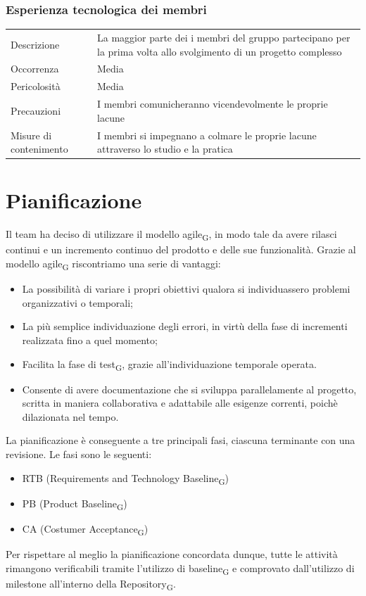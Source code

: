 \documentclass{article}
\begin{document}
\subsubsection{Esperienza tecnologica dei membri}
\begin{center}
\begin{tabular}{P{10em} P{20em}} 
     Descrizione & La maggior parte dei i membri del gruppo partecipano per la prima volta allo svolgimento di un progetto complesso \\ 
    Occorrenza & Media\\
    Pericolosità & Media \\
    Precauzioni & I membri comunicheranno vicendevolmente le proprie lacune\\
    Misure di contenimento & I membri si impegnano a colmare le proprie lacune attraverso lo studio e la pratica \\
\end{tabular}
\label{tab:esptec}
\end{center}

\section{Pianificazione}
Il team ha deciso di utilizzare il modello agile\textsubscript{G}, in modo tale da avere rilasci continui e un incremento continuo del prodotto e delle sue funzionalità. Grazie al modello agile\textsubscript{G} riscontriamo una serie di vantaggi:
\begin{itemize}
    \item La possibilità di variare i propri obiettivi qualora si individuassero problemi organizzativi o temporali;
    \item La più semplice individuazione degli errori, in virtù della fase di incrementi realizzata fino a quel momento;
    \item Facilita la fase di test\textsubscript{G}, grazie all’individuazione temporale operata.
    \item Consente di avere documentazione che si sviluppa parallelamente al progetto, scritta in maniera collaborativa e adattabile alle esigenze correnti, poichè dilazionata nel tempo.
\end{itemize}

La pianificazione è conseguente a tre principali fasi, ciascuna terminante con una revisione. Le fasi sono le seguenti:
\begin{itemize}
    \item RTB (Requirements and Technology Baseline\textsubscript{G})
    \item PB (Product Baseline\textsubscript{G})
    \item CA (Costumer Acceptance\textsubscript{G})
\end{itemize}
Per rispettare al meglio la pianificazione concordata dunque, tutte le  attività rimangono verificabili tramite l’utilizzo di baseline\textsubscript{G} e comprovato dall’utilizzo di milestone all'interno della Repository\textsubscript{G}.
\end{document}
